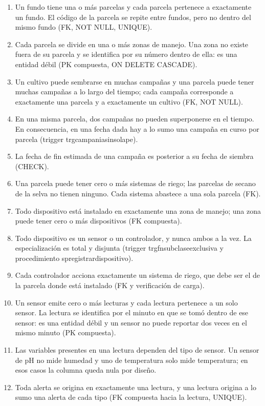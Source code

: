 \documentclass[11pt,letterpaper]{article}
\newcommand{\tbus}{\textunderscore\allowbreak}
\newcommand{\tb}[1]{{\ttfamily\let\_\tbus #1}}
\begin{document}
\begin{enumerate}[label=\textbf{R\arabic*.},leftmargin=2.3em,itemsep=0.15em]
\item Un fundo tiene una o más parcelas y cada parcela pertenece a exactamente un fundo. El código de la parcela se repite entre fundos, pero no dentro del mismo fundo (FK, \tb{NOT NULL}, \tb{UNIQUE}).
\item Cada parcela se divide en una o más zonas de manejo. Una zona no existe fuera de su parcela y se identifica por su número dentro de ella: es una entidad débil (PK compuesta, \tb{ON DELETE CASCADE}).
\item Un cultivo puede sembrarse en muchas campañas y una parcela puede tener muchas campañas a lo largo del tiempo; cada campaña corresponde a exactamente una parcela y a exactamente un cultivo (FK, \tb{NOT NULL}).
\item En una misma parcela, dos campañas no pueden superponerse en el tiempo. En consecuencia, en una fecha dada hay a lo sumo una campaña en curso por parcela (trigger \tb{trg\_campania\_sin\_solape}).
\item La fecha de fin estimada de una campaña es posterior a su fecha de siembra (\tb{CHECK}).
\item Una parcela puede tener cero o más sistemas de riego; las parcelas de secano de la selva no tienen ninguno. Cada sistema abastece a una sola parcela (FK).
\item Todo dispositivo está instalado en exactamente una zona de manejo; una zona puede tener cero o más dispositivos (FK compuesta).
\item Todo dispositivo es un sensor o un controlador, y nunca ambos a la vez. La especialización es total y disjunta (trigger \tb{trg\_fn\_subclase\_exclusiva} y procedimiento \tb{sp\_registrar\_dispositivo}).
\item Cada controlador acciona exactamente un sistema de riego, que debe ser el de la parcela donde está instalado (FK y verificación de carga).
\item Un sensor emite cero o más lecturas y cada lectura pertenece a un solo sensor. La lectura se identifica por el minuto en que se tomó dentro de ese sensor: es una entidad débil y un sensor no puede reportar dos veces en el mismo minuto (PK compuesta).
\item Las variables presentes en una lectura dependen del tipo de sensor. Un sensor de pH no mide humedad y uno de temperatura solo mide temperatura; en esos casos la columna queda nula por diseño.
\item Toda alerta se origina en exactamente una lectura, y una lectura origina a lo sumo una alerta de cada tipo (FK compuesta hacia la lectura, \tb{UNIQUE}).

\end{enumerate}
\end{document}
